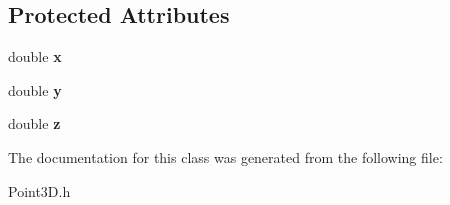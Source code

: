 \subsection*{Protected Attributes}
\begin{DoxyCompactItemize}
\item 
\hypertarget{classPoint3D_abf9d1f564d599503cdb114934c7044b7}{}double {\bfseries x}\label{classPoint3D_abf9d1f564d599503cdb114934c7044b7}

\item 
\hypertarget{classPoint3D_abcb44b06e310b076fa9d65dec8541dd4}{}double {\bfseries y}\label{classPoint3D_abcb44b06e310b076fa9d65dec8541dd4}

\item 
\hypertarget{classPoint3D_a9f4a32e3afccb3c9fe9b5cd88e179c3d}{}double {\bfseries z}\label{classPoint3D_a9f4a32e3afccb3c9fe9b5cd88e179c3d}

\end{DoxyCompactItemize}


The documentation for this class was generated from the following file\+:\begin{DoxyCompactItemize}
\item 
Point3\+D.\+h\end{DoxyCompactItemize}
